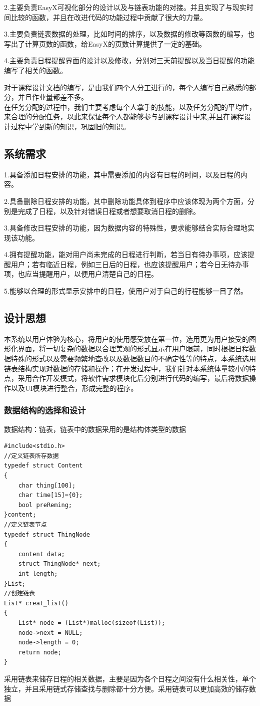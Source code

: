 \documentclass[UTF8]{article}
\begin{document}
2.主要负责EasyX可视化部分的设计以及与链表功能的对接。并且实现了与现实时间比较的函数，并且在改进代码的功能过程中贡献了很大的力量。

3.主要负责链表数据的处理，比如时间的排序，以及数据的修改等函数的编写，也写出了计算页数的函数，给EasyX的页数计算提供了一定的基础。

4.主要负责日程提醒界面的设计以及修改，分别对三天前提醒以及当日提醒的功能编写了相关的函数。

对于课程设计文档的编写，是由我们四个人分工进行的，每个人编写自己熟悉的部分，并且作业量都差不多。\\
在任务分配的过程中，我们主要考虑每个人拿手的技能，以及任务分配的平均性，来合理的分配任务，以此来保证每个人都能够参与到课程设计中来,并且在课程设计过程中学到新的知识，巩固旧的知识。
\subsection{系统需求}
1.具备添加日程安排的功能，其中需要添加的内容有日程的时间，以及日程的内容。

2.具备删除日程安排的功能，其中删除功能具体到程序中应该体现为两个方面，分别是完成了日程，以及针对错误日程或者想要取消日程的删除。

3.具备修改日程安排的功能，因为数据内容的特殊性，要求能够结合实际合理地实现该功能。

4.拥有提醒功能，能对用户尚未完成的日程进行判断，若当日有待办事项，应该提醒用户；若有临近日程，例如三日后的日程，也应该提醒用户；若今日无待办事项，也应当提醒用户，以便用户清楚自己的日程。

5.能够以合理的形式显示安排中的日程，使用户对于自己的行程能够一目了然。

\subsection{设计思想}
本系统以用户体验为核心，将用户的使用感受放在第一位，选用更为用户接受的图形化界面，将一切复杂的数据以合理美观的形式显示在用户眼前，同时根据日程数据特殊的形式以及需要频繁地查改以及数据数目的不确定性等的特点，本系统选用链表结构实现对数据的存储和操作；在开发过程中，我们针对本系统体量较小的特点，采用合作开发模式，将软件需求模块化后分别进行代码的编写，最后将数据操作以及UI模块进行整合，形成完整的程序。
\subsubsection{数据结构的选择和设计}
数据结构：链表，链表中的数据采用的是结构体类型的数据
\begin{verbatim}
#include<stdio.h>
//定义链表所存数据 
typedef struct Content
{
    char thing[100];
    char time[15]={0};
    bool preReming;
}content;
//定义链表节点
typedef struct ThingNode
{
    content data;
    struct ThingNode* next;
    int length;
}List;
//创建链表
List* creat_list()
{
    List* node = (List*)malloc(sizeof(List));
    node->next = NULL;
    node->length = 0;
    return node;
}
\end{verbatim}
采用链表来储存日程的相关数据，主要是因为各个日程之间没有什么相关性，单个独立，并且采用链式存储查找与删除都十分方便。采用链表可以更加高效的储存数据\\
\end{document}
